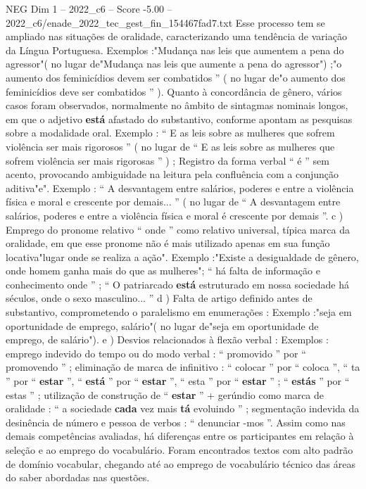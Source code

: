 \begin{textsample}{NEG Dim 1 – 2022\_c6 – Score -5.00 – 2022\_c6/enade\_2022\_tec\_gest\_fin\_154467fad7.txt}
Esse processo tem se ampliado nas situações de oralidade, caracterizando uma tendência de variação da Língua Portuguesa.
Exemplos :"Mudança nas leis que aumentem a pena do agressor"( no lugar de"Mudança nas leis que aumente a pena do agressor") ;"o aumento dos feminicídios devem ser combatidos ” ( no lugar de"o aumento dos feminicídios deve ser combatidos ” ).
Quanto à concordância de gênero, vários casos foram observados, normalmente no âmbito de sintagmas nominais longos, em que o adjetivo \textbf{está} afastado do substantivo, conforme apontam as pesquisas sobre a modalidade oral.
Exemplo : “ E as leis sobre as mulheres que sofrem violência ser mais rigorosos ” ( no lugar de “ E as leis sobre as mulheres que sofrem violência ser mais rigorosas ” ) ; Registro da forma verbal “ é ” sem acento, provocando ambiguidade na leitura pela confluência com a conjunção aditiva"e".
Exemplo : “ A desvantagem entre salários, poderes e entre a violência física e moral e crescente por demais... ” ( no lugar de “ A desvantagem entre salários, poderes e entre a violência física e moral é crescente por demais ”. c ) Emprego do pronome relativo “ onde ” como relativo universal, típica marca da oralidade, em que esse pronome não é mais utilizado apenas em sua função locativa"lugar onde se realiza a ação".
Exemplo :"Existe a desigualdade de gênero, onde homem ganha mais do que as mulheres"; “ há falta de informação e conhecimento onde ” ; “ O patriarcado \textbf{está} estruturado em nossa sociedade há séculos, onde o sexo masculino... ” d ) Falta de artigo definido antes de substantivo, comprometendo o paralelismo em enumerações : Exemplo :"seja em oportunidade de emprego, salário"( no lugar de"seja em oportunidade de emprego, de salário"). e ) Desvios relacionados à flexão verbal : Exemplos : emprego indevido do tempo ou do modo verbal : “ promovido ” por “ promovendo ” ; eliminação de marca de infinitivo : “ colocar ” por “ coloca ”, “ ta ” por “ \textbf{estar} ”, “ \textbf{está} ” por “ \textbf{estar} ”, “ esta ” por “ \textbf{estar} ” ; “ \textbf{estás} ” por “ estas ” ; utilização de construção de “ \textbf{estar} ” + gerúndio como marca de oralidade : “ a sociedade \textbf{cada} vez mais \textbf{tá} evoluindo ” ; segmentação indevida da desinência de número e pessoa de verbos : “ denunciar -mos ”.
Assim como nas demais competências avaliadas, há diferenças entre os participantes em relação à seleção e ao emprego do vocabulário.
Foram encontrados textos com alto padrão de domínio vocabular, chegando até ao emprego de vocabulário técnico das áreas do saber abordadas nas questões.

\end{textsample}
